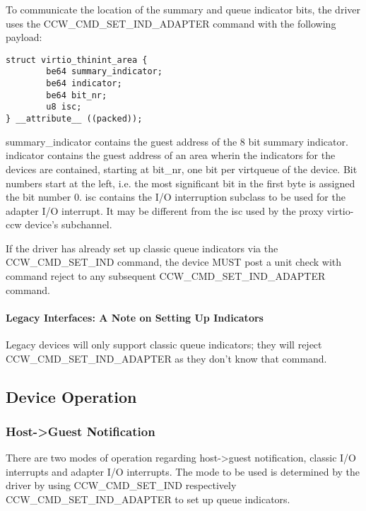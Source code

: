 To communicate the location of the summary and queue indicator bits,
the driver uses the CCW_CMD_SET_IND_ADAPTER command with the following
payload:

\begin{lstlisting}
struct virtio_thinint_area {
        be64 summary_indicator;
        be64 indicator;
        be64 bit_nr;
        u8 isc;
} __attribute__ ((packed));
\end{lstlisting}

summary_indicator contains the guest address of the 8 bit summary
indicator.
indicator contains the guest address of an area wherin the indicators
for the devices are contained, starting at bit_nr, one bit per
virtqueue of the device. Bit numbers start at the left, i.e. the most
significant bit in the first byte is assigned the bit number 0.
isc contains the I/O interruption subclass to be used for the adapter
I/O interrupt. It may be different from the isc used by the proxy
virtio-ccw device's subchannel.

If the driver has already set up classic queue indicators via the
CCW_CMD_SET_IND command, the device MUST post a unit check with
command reject to any subsequent CCW_CMD_SET_IND_ADAPTER command.

\paragraph{Legacy Interfaces: A Note on Setting Up Indicators}\label{sec:Virtio Transport Options / Virtio over channel I/O / Device Initialization / Setting Up Indicators / Legacy Interfaces: A Note on Setting Up Indicators}

Legacy devices will only support classic queue indicators; they will
reject CCW_CMD_SET_IND_ADAPTER as they don't know that command.

\subsection{Device Operation}\label{sec:Virtio Transport Options / Virtio over channel I/O / Device Operation}

\subsubsection{Host->Guest Notification}\label{sec:Virtio Transport Options / Virtio over channel I/O / Device Operation / Host->Guest Notification}

There are two modes of operation regarding host->guest notification,
classic I/O interrupts and adapter I/O interrupts. The mode to be
used is determined by the driver by using CCW_CMD_SET_IND respectively
CCW_CMD_SET_IND_ADAPTER to set up queue indicators.

